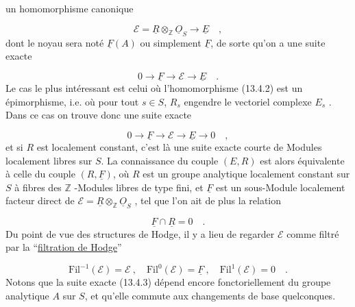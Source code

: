 
un homomorphisme canonique

\begin{equation}\tag{13.4.2}
\mathcal{E} = \underline{R} \otimes_{\mathbb{Z}} \underline{O}_S \longrightarrow \underline{E} \quad ,
\end{equation}
dont le noyau sera noté $\underline{F}(A)$ ou simplement $\underline{F}$, de sorte qu'on a une suite exacte

\begin{equation}\tag{13.4.3}
0 \longrightarrow \underline{F} \longrightarrow \mathcal{E} \longrightarrow \underline{E} \quad .
\end{equation}
Le cas le plus intéressant est celui où l'homomorphisme (13.4.2) est un épimorphisme, i.e. où pour tout $s \in S$, $R_s$ engendre le vectoriel complexe $E_s$ . Dans ce cas on trouve donc une suite exacte

\begin{equation}\tag{13.4.4}
0 \longrightarrow \underline{F} \longrightarrow \mathcal{E} \longrightarrow \underline{E} \longrightarrow 0 \quad ,
\end{equation}
et si $R$ est localement constant, c'est là une suite exacte courte de Modules localement libres sur $S$. La connaissance du couple $(E,R)$ est alors équivalente à celle du couple $(R,\underline{F})$, où $R$ est un groupe analytique localement constant sur $S$ à fibres des $\mathbb{Z}$ -Modules libres de type fini, et $\underline{F}$ est un sous-Module localement facteur direct de $\mathcal{E} = \underline{R} \otimes_{\mathbb{Z}} \underline{O}_S$ , tel que l'on ait de plus la relation

\begin{equation}\tag{13.4.5}
\underline{F} \cap \underline{R} = 0 \quad .
\end{equation}
Du point de vue des structures de Hodge, il y a lieu de regarder $\mathcal{E}$ comme filtré par la ``\underline{filtration de Hodge}''

\begin{equation}\tag{13.4.6}
\mathrm{Fil}^{-1}(\mathcal{E}) = \mathcal{E} \ , \quad \mathrm{Fil}^{0}(\mathcal{E}) = \underline{F} \ , \quad \mathrm{Fil}^{1}(\mathcal{E}) = 0 \quad .
\end{equation}
Notons que la suite exacte (13.4.3) dépend encore fonctoriellement du groupe analytique $A$ sur $S$, et qu'elle commute aux changements de base quelconques.



